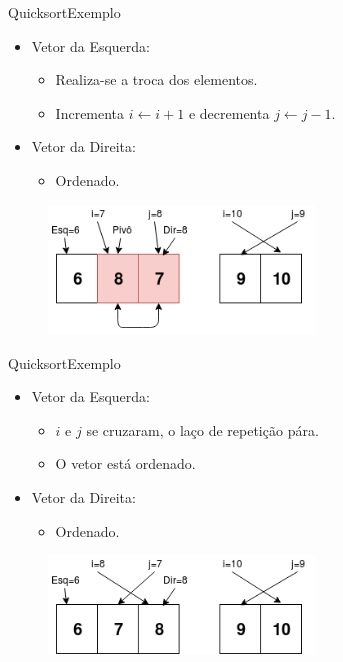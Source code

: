 \documentclass[aspectratio=169]{beamer}
\begin{document}

\begin{frame}{Quicksort}{Exemplo}
\begin{itemize}
 \item Vetor da Esquerda:
\begin{itemize}
 \item Realiza-se a troca dos elementos.
 \item Incrementa $i\leftarrow i + 1$ e decrementa $j \leftarrow j - 1$.
\end{itemize}
\item Vetor da Direita:
\begin{itemize}
\item Ordenado.
\end{itemize}
\end{itemize}

\begin{figure}[!h]
  \centering
  \includegraphics[width=200pt]{imgs/quick/quick40.png}
  \label{fig_quick40}
\end{figure}

\end{frame}



\begin{frame}{Quicksort}{Exemplo}
\begin{itemize}
 \item Vetor da Esquerda:
\begin{itemize}
\item $i$ e $j$ se cruzaram, o laço de repetição pára.
\item O vetor está ordenado.
\end{itemize}
\item Vetor da Direita:
\begin{itemize}
\item Ordenado.
\end{itemize}
\end{itemize}

\begin{figure}[!h]
  \centering
  \includegraphics[width=200pt]{imgs/quick/quick41.png}
  \label{fig_quick41}
\end{figure}

\end{frame}
\end{document}
